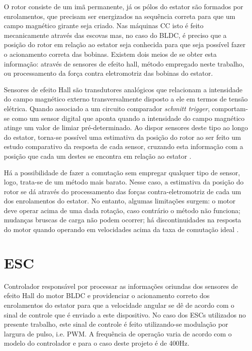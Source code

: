 O rotor consiste de um imã permanente, já os pólos do estator são formados por enrolamentos, que precisam ser energizados na sequência correta 
para que um campo magnético girante seja criado.
Nas máquinas CC isto é feito mecanicamente através das escovas mas, no caso do BLDC, é preciso que a posição do rotor em relação ao estator seja 
conhecida para que seja possível fazer o acionamento correta das bobinas.
Existem dois meios de se obter esta informação: através de sensores de efeito hall, método empregado neste trabalho, ou processamento da força contra 
eletromotriz das bobinas do estator.

Sensores de efeito Hall são transdutores analógicos que relacionam a intensidade do campo magnético externo transversalmente disposto a ele em termos 
de tensão elétrica. Quando associado a um circuito comparador \textit{schmitt trigger}, comportam-se como um sensor digital que aponta quando a 
intensidade do campo magnético atinge um valor de limiar pré-determinado. Ao dispor sensores deste tipo ao longo do estator, torna-se possível uma 
estimativa da posição do rotor ao ser feito um estudo comparativo da resposta de cada sensor, cruzando esta informação com a posição que 
cada um destes se encontra em relação ao estator \cite{motor_1}.

Há a possibilidade de fazer a comutação sem empregar qualquer tipo de sensor, logo, trata-se de um método mais barato. 
Nesse caso, a estimativa da posição do rotor se dá através do processamento das forças contra-eletromotriz de cada um dos enrolamentos do estator.
No entanto, algumas limitações surgem: o motor deve operar acima de uma dada rotação, caso contrário o método não funciona; mudanças bruscas de carga 
não podem ocorrer; há discontinuidades na resposta do motor quando operando em velocidades acima da taxa de comutação ideal \cite{motor_1}.

\section{ESC}
Controlador responsável por processar as informações oriundas dos sensores de efeito Hall do motor BLDC e providenciar o acionamento correto 
dos enrolamentos do estator para que a velocidade angular se dê de acordo com o sinal de controle que é enviado a este dispositivo.
No caso dos ESCs utilizados no presente trabalho, este sinal de controle é feito utilizando-se modulação por largura de pulso, i.e. PWM. 
A frequência de operação varia de acordo com o modelo do controlador e para o caso deste projeto é de 400Hz.
